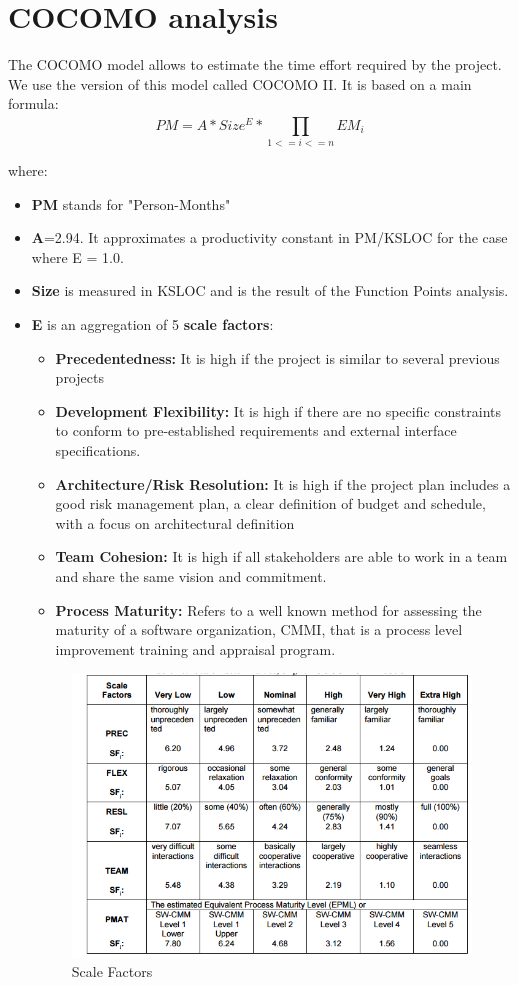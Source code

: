 \section{COCOMO analysis}
The COCOMO model allows to estimate the time effort required by the project. We use the version of this model called COCOMO II. It is based on a main formula:
\begin{equation}
PM = A * Size^{E} * \prod_{1<=i<=n}^{} EM_{i} 
\end{equation}

where:
\begin{itemize}
	\item \textbf{PM} stands for "Person-Months"
	\item \textbf{A}=2.94. It approximates a productivity constant in PM/KSLOC for the case where E = 1.0.
	\item \textbf{Size} is measured in KSLOC and is the result of the Function Points analysis.
	\item \textbf{E} is an aggregation of 5 \textbf{scale factors}:
	\begin{itemize}[label = {-}]
		\item \textbf{Precedentedness:} It is high if the project is similar to several previous projects
		\item \textbf{Development Flexibility:} It is high if there are no specific constraints to conform to pre-established     requirements and external interface specifications.
		\item \textbf{Architecture/Risk Resolution:} It is high if the project plan includes a good risk management plan, a clear definition of budget and schedule, with a focus on architectural definition
		\item \textbf{Team Cohesion:} It is high if all stakeholders are able to work in a team and share the same vision and commitment.
		\item \textbf{Process Maturity:} Refers to a well known method for assessing the maturity of a software organization, CMMI, that is a process level improvement training and appraisal program.
	\end{itemize}
	\begin{figure}[H] 
		\centering
		\includegraphics[scale = 0.7]{img/scaleFactors.png}
		\caption{Scale Factors}
	\end{figure}
	

\end{itemize}

